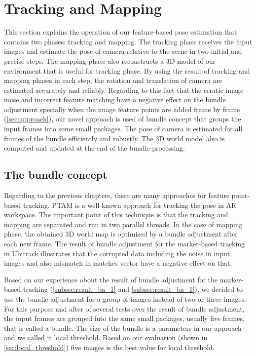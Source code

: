 \section{Tracking and Mapping}
This section explains the operation of our feature-based pose estimation that contains two phases: tracking and mapping. The tracking phase receives the input images and estimate the pose of camera relative to the scene in two initial and precise steps. The mapping phase also reconstructs a 3D model of our environment that is useful for tracking phase. By using the result of tracking and mapping phases in each step, the rotation and translation of camera are estimated accurately and reliably. Regarding to this fact that the erratic image noise and incorrect feature matching have a negative effect on the bundle adjustment specially when the image feature points are added frame by frame (\autoref{sec:approach}), our novel approach is used of bundle concept that groups the input frames into some small packages. The pose of camera is estimated for all frames of the bundle efficiently and robustly. The 3D world model also is computed and updated at the end of the bundle processing.

\subsection{The bundle concept} \label{sebsec:bundle_concept}
Regarding to the previous chapters, there are many approaches for feature point-based tracking. PTAM \cite{klein2007parallel} is a well-known approach for tracking the pose in AR workspace. The important point of this technique is that the tracking and mapping are separated and run in two parallel threads. In the case of mapping phase, the obtained 3D world map is optimized by a bundle adjustment after each new frame. The result of bundle adjustment for the market-based tracking in Ubitrack illustrates that the corrupted data including the noise in input images and also mismatch in matches vector have a negative effect on that.

Based on our experience about the result of bundle adjustment for the marker-based tracking (\autoref{subsec:result_ba_1} and \autoref{subsec:result_ba_1}), we decided to use the bundle adjustment for a group of images instead of two or three images. For this purpose and after of several tests over the result of bundle adjustment, the input frames are grouped into the same small packages, usually five frames, that is called a bundle. The size of the bundle is a parameters in our approach and we called it local threshold. Based on our evaluation (shown in \autoref{sec:local_threshold}) five images is the best value for local threshold.

